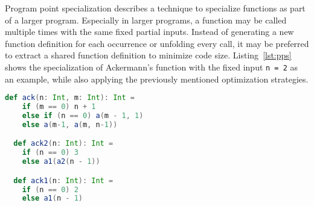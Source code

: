 Program point specialization describes a technique to specialize functions as part of a larger program.
Especially in larger programs, a function may be called multiple times with the same fixed partial inputs.
Instead of generating a new function definition for each occurrence or unfolding every call, it may be preferred to extract a shared function definition to minimize code size.
Listing~\ref{lst:pps} shows the specialization of Ackermann's function with the fixed input \texttt{n = 2} as an example, while also applying the previously mentioned optimization strategies.

\begin{lstlisting}[language=scala,caption={Definition of the \texttt{ackermann} function and its specialization.},label={lst:pps}]
  def ack(n: Int, m: Int): Int =
    if (m == 0) n + 1
    else if (n == 0) a(m - 1, 1)
    else a(m-1, a(m, n-1))

  def ack2(n: Int): Int =
    if (n == 0) 3
    else a1(a2(n - 1))

  def ack1(n: Int): Int =
    if (n == 0) 2
    else a1(n - 1)
\end{lstlisting}


